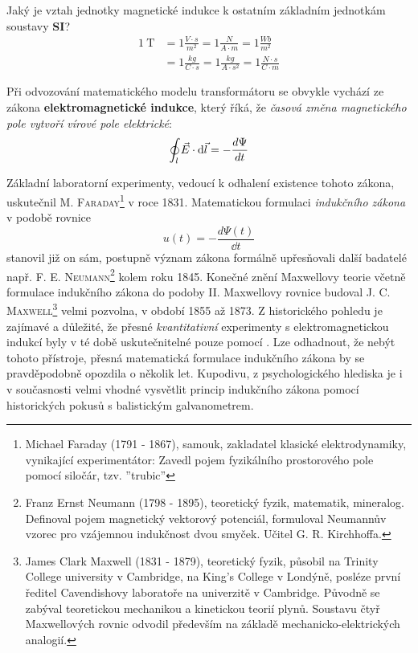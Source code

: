     \begin{mdframed}[style=mdnote]
      Jaký je vztah jednotky magnetické indukce k ostatním základním jednotkám soustavy \textbf{SI}? 
      \begin{align*}
        \SI{1}{\tesla}
          &= 1\frac{V\cdot s}{m^2} = 1\frac{N}{A\cdot m} = 1\frac{Wb}{m^2}          \\
          &= 1\frac{kg}{C\cdot s} = 1\frac{kg}{A\cdot s^2} = 1\frac{N\cdot s}{C \cdot m}
      \end{align*}
    \end{mdframed}
    
    Při odvozování matematického modelu transformátoru se obvykle vychází ze zákona 
    \textbf{elektromagnetické indukce}, který říká, že \emph{časová změna magnetického pole vytvoří 
    vírové pole elektrické}:
    \begin{equation}\label{es:eq_ind_z}
      \oint_l \vec{E} \cdot \mathop{}\!\mathrm{d}\vec{l} = - \dfrac{d \Psi}{d t}
    \end{equation}
     
    Základní laboratorní experimenty, vedoucí k odhalení existence tohoto zákona, uskutečnil 
    \textsc{M. Faraday}\footnote{Michael Faraday (1791 - 1867), samouk, zakladatel klasické 
    elektrodynamiky, vynikající experimentátor: Zavedl pojem fyzikálního prostorového pole pomocí 
    siločár, tzv. ''trubic''} v roce 1831. Matematickou formulaci \emph{indukčního zákona} v podobě 
    rovnice
    \begin{equation}\label{TEO:eq102}
      u(t) = - \frac{d\Psi(t)}{\dd{t}}
    \end{equation} 
    stanovil již on sám, postupně význam zákona formálně upřesňovali další badatelé např. \textsc{F.
    E. Neumann}\footnote{Franz Ernst Neumann (1798 - 1895), teoretický fyzik, matematik, mineralog.
    Definoval pojem magnetický vektorový potenciál, formuloval Neumannův vzorec pro vzájemnou
    indukčnost dvou smyček. Učitel G. R. Kirchhoffa.} kolem roku 1845. Konečné znění Maxwellovy
    teorie včetně formulace indukčního zákona do podoby II. Maxwellovy rovnice budoval \textsc{J. C.
    Maxwell}\footnote{James Clark Maxwell (1831 - 1879), teoretický fyzik, působil na Trinity
    College university v Cambridge, na King's College v Londýně, posléze první ředitel Cavendishovy
    laboratoře na univerzitě v Cambridge. Původně se zabýval teoretickou mechanikou a kinetickou
    teorií plynů. Soustavu čtyř Maxwellových rovnic odvodil především na základě
    mechanicko-elektrických analogií.} velmi pozvolna, v období 1855 až 1873. Z historického pohledu
    je zajímavé a důležité, že přesné \emph{kvantitativní} experimenty s elektromagnetickou indukcí
    byly v té době uskutečnitelné pouze pomocí \wikiGalvanometer. Lze odhadnout, že nebýt tohoto
    přístroje, přesná matematická formulace indukčního zákona by se pravděpodobně opozdila o několik
    let. Kupodivu, z psychologického hlediska je i v současnosti velmi vhodné vysvětlit princip
    indukčního zákona pomocí historických pokusů s balistickým galvanometrem.
    
